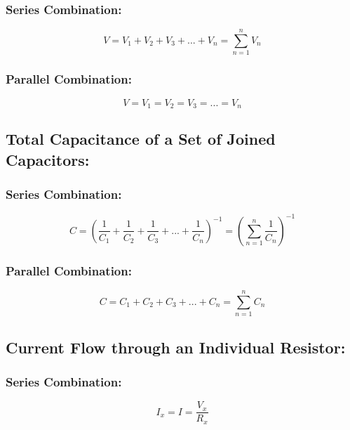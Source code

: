 \documentclass[a4paper]{report}
\begin{document}
            \subsubsection{Series Combination:}
                \begin{equation}
                    V = V_1 + V_2 + V_3 + ... + V_n = \sum_{n = 1}^n V_n 
                \end{equation}
            \subsubsection{Parallel Combination:}
                \begin{equation}
                    V = V_1 = V_2 = V_3 = ... = V_n
                \end{equation}
        \subsection{Total Capacitance of a Set of Joined Capacitors:}
            \subsubsection{Series Combination:}    
                \begin{equation}
                    C = (\frac{1}{C_1} + \frac{1}{C_2} + \frac{1}{C_3} + ... + \frac{1}{C_n})^{-1} = (\sum_{n = 1}^n \frac{1}{C_n})^{-1}
                \end{equation}
            \subsubsection{Parallel Combination:}
                \begin{equation}
                    C = C_1 + C_2 + C_3 + ... + C_n = \sum_{n = 1}^n C_n
                \end{equation}
        \subsection{Current Flow through an Individual Resistor:}
            \subsubsection{Series Combination:}
                \begin{equation}
                    I_x = I = \frac{V_x}{R_x}
                \end{equation}
\end{document}
